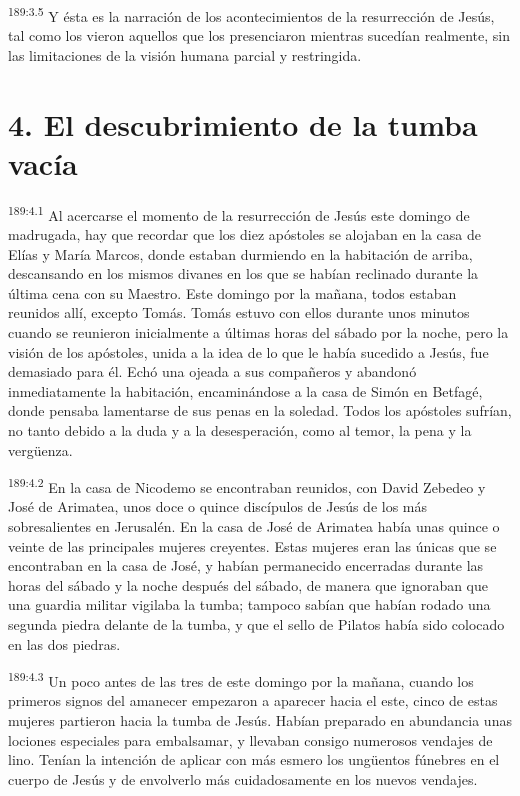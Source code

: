 \par 
\textsuperscript{189:3.5} Y ésta es la narración de los acontecimientos de la resurrección de Jesús, tal como los vieron aquellos que los presenciaron mientras sucedían realmente, sin las limitaciones de la visión humana parcial y restringida.

\section*{4. El descubrimiento de la tumba vacía}
\par 
\textsuperscript{189:4.1} Al acercarse el momento de la resurrección de Jesús este domingo de madrugada, hay que recordar que los diez apóstoles se alojaban en la casa de Elías y María Marcos, donde estaban durmiendo en la habitación de arriba, descansando en los mismos divanes en los que se habían reclinado durante la última cena con su Maestro. Este domingo por la mañana, todos estaban reunidos allí, excepto Tomás. Tomás estuvo con ellos durante unos minutos cuando se reunieron inicialmente a últimas horas del sábado por la noche, pero la visión de los apóstoles, unida a la idea de lo que le había sucedido a Jesús, fue demasiado para él. Echó una ojeada a sus compañeros y abandonó inmediatamente la habitación, encaminándose a la casa de Simón en Betfagé, donde pensaba lamentarse de sus penas en la soledad. Todos los apóstoles sufrían, no tanto debido a la duda y a la desesperación, como al temor, la pena y la verg\"uenza.

\par 
\textsuperscript{189:4.2} En la casa de Nicodemo se encontraban reunidos, con David Zebedeo y José de Arimatea, unos doce o quince discípulos de Jesús de los más sobresalientes en Jerusalén. En la casa de José de Arimatea había unas quince o veinte de las principales mujeres creyentes. Estas mujeres eran las únicas que se encontraban en la casa de José, y habían permanecido encerradas durante las horas del sábado y la noche después del sábado, de manera que ignoraban que una guardia militar vigilaba la tumba; tampoco sabían que habían rodado una segunda piedra delante de la tumba, y que el sello de Pilatos había sido colocado en las dos piedras.

\par 
\textsuperscript{189:4.3} Un poco antes de las tres de este domingo por la mañana, cuando los primeros signos del amanecer empezaron a aparecer hacia el este, cinco de estas mujeres partieron hacia la tumba de Jesús. Habían preparado en abundancia unas lociones especiales para embalsamar, y llevaban consigo numerosos vendajes de lino. Tenían la intención de aplicar con más esmero los ung\"uentos fúnebres en el cuerpo de Jesús y de envolverlo más cuidadosamente en los nuevos vendajes.

